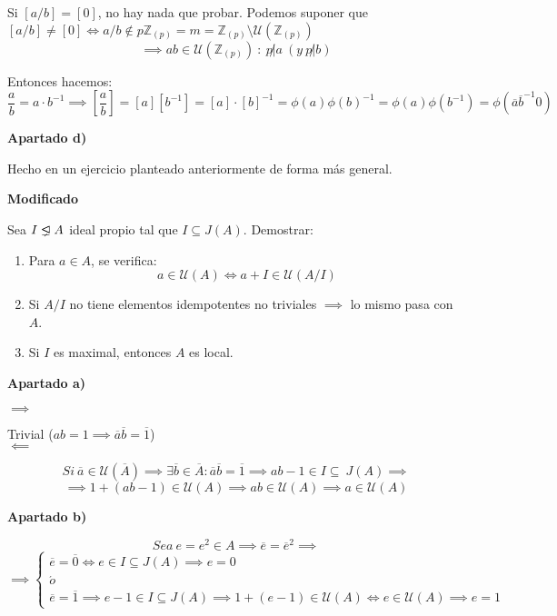 \documentclass[openany]{book}
\begin{document}
\begin{exercise}
    Si $ [a/b] = [0]$, no hay nada que probar. Podemos suponer que $ [a/b] \ne [0] \iff a/b \not \in p\mathbb{Z}_{(p)} = m = \mathbb{Z}_{(p)} \setminus \mathcal{U}(\mathbb{Z}_{(p)})$
    $$ \implies ab \in \mathcal{U}(\mathbb{Z}_{(p)})\ :\ p\not | a\ (y\ p\not | b) $$

    Entonces hacemos:
    $$ \dfrac{a}{b} = a\cdot b ^{-1} \implies [\dfrac{a}{b}] = [a][b ^{-1}] = [a]\cdot [b] ^{-1} = \phi(a)\phi(b) ^{-1} = \phi(a)\phi(b ^{-1}) = \phi (\overline{a} \overline{b} ^{-1}0)$$

    \begin{flushright}
        \textbf{Apartado d)}
    \end{flushright}
    
    Hecho en un ejercicio planteado anteriormente de forma más general.

\end{exercise}

\begin{exercise}
    \textbf{Modificado}
    
    Sea $ I \properideal A $ ideal propio tal que $ I \subseteq J(A) $. Demostrar:
    \begin{enumerate}
        \item Para $ a \in A $, se verifica:
        $$ a \in \mathcal{U}(A) \iff a +I \in \mathcal{U}(A/I) $$
        \item Si $A/I$ no tiene elementos idempotentes no triviales $ \implies $ lo mismo pasa con $ A $.
        \item Si $ I $ es maximal, entonces $ A $ es local.
    \end{enumerate}
    
    \begin{flushright}
        \textbf{Apartado a)}
    \end{flushright}
    $ \implies $

    Trivial ($ ab = 1 \implies \overline{a}\overline{b} = \overline{1} $)\\
    $ \impliedby $

    $$Si\   \overline{a} \in \mathcal{U}(\overline{A}) \implies \exists \overline{b} \in \overline{A}: \overline{a}\overline{b} = \overline{1} \implies ab-1 \in I \subseteq\ J(A) \implies $$ 
    $$ \implies 1+(ab-1) \in \mathcal{U}(A) \implies ab \in \mathcal{U}(A) \implies a \in \mathcal{U}(A) $$

    \begin{flushright}
        \textbf{Apartado b)}
    \end{flushright}
    $$ Sea\ e = e^2 \in A \implies \overline{e} = \overline{e}^2 \implies$$
    $$ \implies \left\{
    \begin{array}{l}
        \overline{e}=\overline{0} \iff e \in I \subseteq J(A) \implies e =0\\
        \acute o\\
        \overline{e} = \overline{1} \implies e-1 \in I \subseteq J(A) \implies 1+(e-1) \in \mathcal{U}(A) \iff e \in \mathcal{U}(A) \implies e=1
    \end{array}
    \right. $$

    
\end{exercise}
\end{document}
